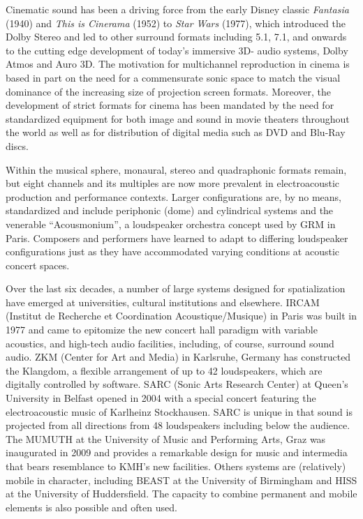 \documentclass{article}
\begin{document}
Cinematic sound has been a driving force from the early Disney classic \emph{Fantasia} (1940) and \emph{This is Cinerama} (1952) to \emph{Star Wars} (1977), which introduced the Dolby Stereo and led to other surround formats including 5.1, 7.1, and onwards to the cutting edge development of today’s immersive 3D- audio systems, Dolby Atmos and Auro 3D. The motivation for multichannel reproduction in cinema is based in part on the need for a commensurate sonic space to match the visual dominance of the increasing size of projection screen formats. Moreover, the development of strict formats for cinema has been mandated by the need for standardized equipment for both image and sound in movie theaters throughout the world as well as for distribution of digital media such as DVD and Blu-Ray discs.

Within the musical sphere, monaural, stereo and quadraphonic formats remain, but eight channels and its multiples are now more prevalent in electroacoustic production and performance contexts. Larger configurations are, by no means, standardized and include periphonic (dome) and cylindrical systems and the venerable “Acousmonium”, a loudspeaker orchestra concept used by GRM in Paris. Composers and performers have learned to adapt to differing loudspeaker configurations just as they have accommodated varying conditions at acoustic concert spaces.

Over the last six decades, a number of large systems designed for spatialization have emerged at universities, cultural institutions and elsewhere. IRCAM (Institut de Recherche et Coordination Acoustique/Musique) in Paris was built in 1977 and came to epitomize the new concert hall paradigm with variable acoustics, and high-tech audio facilities, including, of course, surround sound audio. ZKM (Center for Art and Media) in Karlsruhe, Germany has constructed the Klangdom, a flexible arrangement of up to 42 loudspeakers, which are digitally controlled by software. SARC (Sonic Arts Research Center) at Queen’s University in Belfast opened in 2004 with a special concert featuring the electroacoustic music of Karlheinz Stockhausen. SARC is unique in that sound is projected from all directions from 48 loudspeakers including below the audience. The MUMUTH at the University of Music and Performing Arts, Graz was inaugurated in 2009 and provides a remarkable design for music and intermedia that bears resemblance to KMH's new facilities. Others systems are (relatively) mobile in character, including BEAST at the University of Birmingham and HISS at the University of Huddersfield. The capacity to combine permanent and mobile elements is also possible and often used. 
\end{document}
